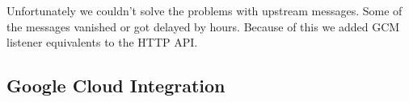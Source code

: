 Unfortunately we couldn't solve the problems with upstream messages. Some of the messages vanished or got delayed by hours. Because of
this we added GCM listener equivalents to the HTTP API.


\subsection{Google Cloud Integration}
